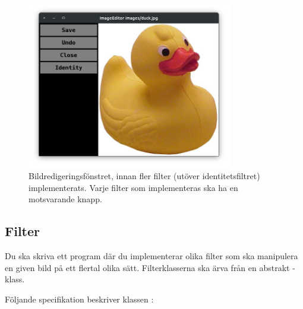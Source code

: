 \begin{figure}[H]
\centering
\includegraphics[width=0.8\textwidth]{../img/w12-assignment-photo/photo-duck.png}
\caption{Bildredigeringsfönstret, innan fler filter (utöver identitetsfiltret) implementerats. Varje filter som implementeras ska ha en motsvarande knapp.}
\label{photo:fig:editor-one-filter}
\end{figure}
  


\subsection{Filter}
Du ska skriva ett program där du implementerar olika filter som ska manipulera en given bild på ett flertal olika sätt. 
Filterklasserna ska ärva från en abstrakt -klass.

Följande specifikation beskriver klassen :

